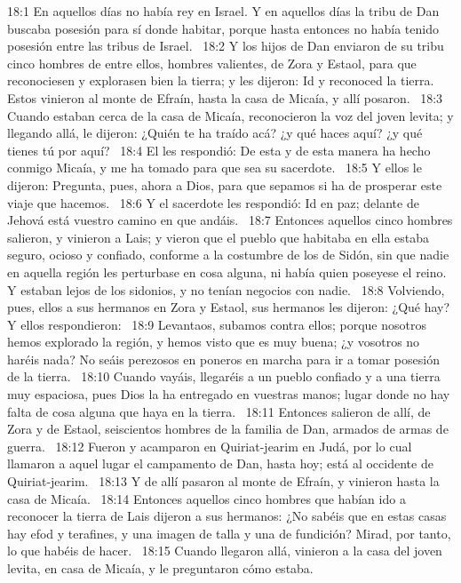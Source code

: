 18:1 En aquellos días no había rey en Israel. Y en aquellos días la tribu de Dan buscaba posesión para sí donde habitar, porque hasta entonces no había tenido posesión entre las tribus de Israel.  
18:2 Y los hijos de Dan enviaron de su tribu cinco hombres de entre ellos, hombres valientes, de Zora y Estaol, para que reconociesen y explorasen bien la tierra; y les dijeron: Id y reconoced la tierra. Estos vinieron al monte de Efraín, hasta la casa de Micaía, y allí posaron.  
18:3 Cuando estaban cerca de la casa de Micaía, reconocieron la voz del joven levita; y llegando allá, le dijeron: ¿Quién te ha traído acá? ¿y qué haces aquí? ¿y qué tienes tú por aquí?  
18:4 El les respondió: De esta y de esta manera ha hecho conmigo Micaía, y me ha tomado para que sea su sacerdote.  
18:5 Y ellos le dijeron: Pregunta, pues, ahora a Dios, para que sepamos si ha de prosperar este viaje que hacemos.  
18:6 Y el sacerdote les respondió: Id en paz; delante de Jehová está vuestro camino en que andáis.  
18:7 Entonces aquellos cinco hombres salieron, y vinieron a Lais; y vieron que el pueblo que habitaba en ella estaba seguro, ocioso y confiado, conforme a la costumbre de los de Sidón, sin que nadie en aquella región les perturbase en cosa alguna, ni había quien poseyese el reino. Y estaban lejos de los sidonios, y no tenían negocios con nadie.  
18:8 Volviendo, pues, ellos a sus hermanos en Zora y Estaol, sus hermanos les dijeron: ¿Qué hay? Y ellos respondieron:  
18:9 Levantaos, subamos contra ellos; porque nosotros hemos explorado la región, y hemos visto que es muy buena; ¿y vosotros no haréis nada? No seáis perezosos en poneros en marcha para ir a tomar posesión de la tierra.  
18:10 Cuando vayáis, llegaréis a un pueblo confiado y a una tierra muy espaciosa, pues Dios la ha entregado en vuestras manos; lugar donde no hay falta de cosa alguna que haya en la tierra.  
18:11 Entonces salieron de allí, de Zora y de Estaol, seiscientos hombres de la familia de Dan, armados de armas de guerra.  
18:12 Fueron y acamparon en Quiriat-jearim en Judá, por lo cual llamaron a aquel lugar el campamento de Dan, hasta hoy; está al occidente de Quiriat-jearim.  
18:13 Y de allí pasaron al monte de Efraín, y vinieron hasta la casa de Micaía.  
18:14 Entonces aquellos cinco hombres que habían ido a reconocer la tierra de Lais dijeron a sus hermanos: ¿No sabéis que en estas casas hay efod y terafines, y una imagen de talla y una de fundición? Mirad, por tanto, lo que habéis de hacer.  
18:15 Cuando llegaron allá, vinieron a la casa del joven levita, en casa de Micaía, y le preguntaron cómo estaba.  
